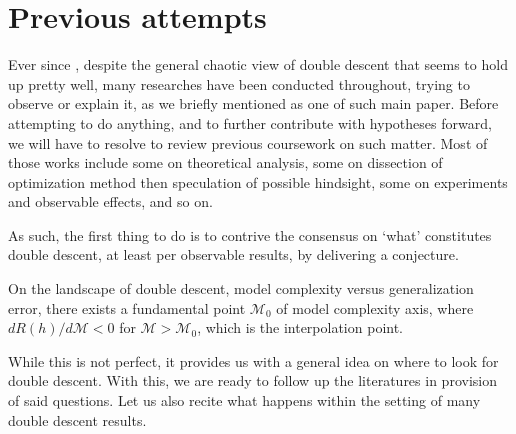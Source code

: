 \documentclass[10pt]{article} %
\begin{document}
\section{Previous attempts}

Ever since \cite{belkin_reconciling_2019}, despite the general chaotic view of double descent that seems to hold up pretty well, many researches have been conducted throughout, trying to observe or explain it, as we briefly mentioned \cite{nakkiran_deep_2019} as one of such main paper. Before attempting to do anything, and to further contribute with hypotheses forward, we will have to resolve to review previous coursework on such matter. Most of those works include some on theoretical analysis, some on dissection of optimization method then speculation of possible hindsight, some on experiments and observable effects, and so on. 

As such, the first thing to do is to contrive the consensus on `what' constitutes double descent, at least per observable results, by delivering a conjecture. 

\begin{conjecture}
    On the landscape of double descent, model complexity versus generalization error, there exists a fundamental point $\mathcal{M}_{0}$ of model complexity axis, where $dR(h)/d\mathcal{M}< 0$ for $\mathcal{M}> \mathcal{M}_{0}$, which is the interpolation point. 
\end{conjecture}

While this is not perfect, it provides us with a general idea on where to look for double descent. With this, we are ready to follow up the literatures in provision of said questions. Let us also recite what happens within the setting of many double descent results. 
\end{document}
